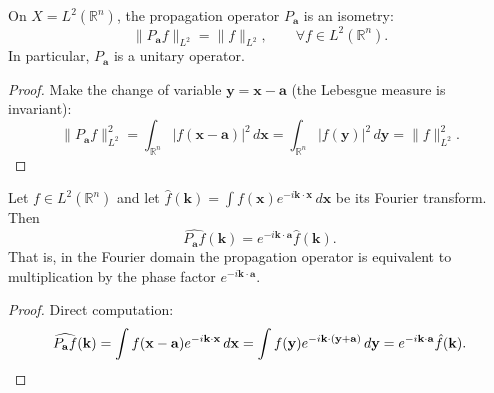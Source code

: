 \begin{proposition}\label{prop:propagation_isometry}
On $X = L^2(\mathbb{R}^n)$, the propagation operator $P_{\mathbf{a}}$ is an isometry:
\[
\|P_{\mathbf{a}} f\|_{L^2} = \|f\|_{L^2}, \qquad \forall f\in L^2(\mathbb{R}^n).
\]
In particular, $P_{\mathbf{a}}$ is a unitary operator.
\end{proposition}

\begin{proof}
Make the change of variable $\mathbf{y} = \mathbf{x}-\mathbf{a}$ (the Lebesgue measure is invariant):
\[
\|P_{\mathbf{a}} f\|_{L^2}^2 = \int_{\mathbb{R}^n}|f(\mathbf{x}-\mathbf{a})|^2\,d\mathbf{x} = \int_{\mathbb{R}^n}|f(\mathbf{y})|^2\,d\mathbf{y} = \|f\|_{L^2}^2.
\]
\end{proof}

\begin{proposition}\label{prop:propagation_fourier}
Let $f\in L^2(\mathbb{R}^n)$ and let $\hat f(\mathbf{k}) = \int f(\mathbf{x})e^{-i\mathbf{k}\cdot\mathbf{x}}\,d\mathbf{x}$ be its Fourier transform. Then
\[
\widehat{P_{\mathbf{a}} f}(\mathbf{k}) = e^{-i\mathbf{k}\cdot\mathbf{a}}\hat f(\mathbf{k}).
\]
That is, in the Fourier domain the propagation operator is equivalent to multiplication by the phase factor $e^{-i\mathbf{k}\cdot\mathbf{a}}$.
\end{proposition}

\begin{proof}
Direct computation:
\[
\widehat{P_{\mathbf{a}} f}(\mathbf{k}) = \int f(\mathbf{x}-\mathbf{a})e^{-i\mathbf{k}\cdot\mathbf{x}}\,d\mathbf{x} = \int f(\mathbf{y})e^{-i\mathbf{k}\cdot(\mathbf{y}+\mathbf{a})}\,d\mathbf{y} = e^{-i\mathbf{k}\cdot\mathbf{a}}\hat f(\mathbf{k}). \qedhere
\]
\end{proof}

